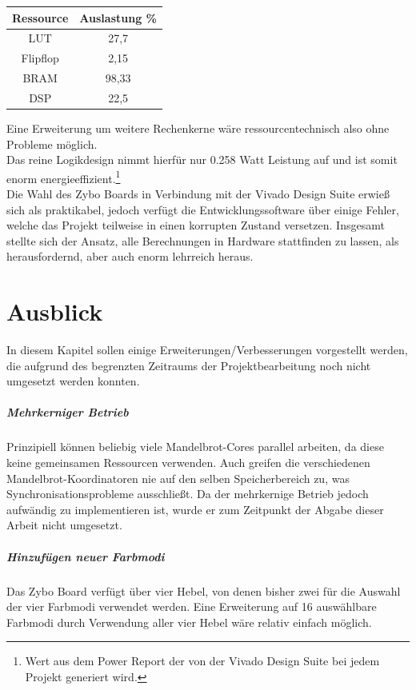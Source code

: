 \documentclass[a4paper,12pt,onesided]{report}
\begin{document}
\begin{table}[H]
	\centering
	\begin{tabular}{|c|c|}
		\hline
		Ressource & Auslastung \% \\ \hline
		LUT & 27,7 \\ \hline
		Flipflop & 2,15 \\ \hline
		BRAM & 98,33 \\ \hline
		DSP & 22,5 \\ \hline
	\end{tabular}
\end{table}

Eine Erweiterung um weitere Rechenkerne wäre ressourcentechnisch also ohne Probleme möglich.\\
Das reine Logikdesign nimmt hierfür nur 0.258 Watt Leistung auf und ist somit enorm energieeffizient.\footnote{Wert aus dem Power Report der von der Vivado Design Suite bei jedem Projekt generiert wird.}\\
Die Wahl des Zybo Boards in Verbindung mit der Vivado Design Suite erwieß sich als praktikabel, jedoch verfügt die Entwicklungssoftware über einige Fehler, welche das Projekt teilweise in einen korrupten Zustand versetzen.
Insgesamt stellte sich der Ansatz, alle Berechnungen in Hardware stattfinden zu lassen, als herausfordernd, aber auch enorm lehrreich heraus.


\chapter{Ausblick}
In diesem Kapitel sollen einige Erweiterungen/Verbesserungen vorgestellt werden, die aufgrund des begrenzten Zeitraums der Projektbearbeitung noch nicht umgesetzt werden konnten.

\paragraph{Mehrkerniger Betrieb}
Prinzipiell können beliebig viele Mandelbrot-Cores parallel arbeiten, da diese keine gemeinsamen Ressourcen verwenden. Auch greifen die verschiedenen Mandelbrot-Koordinatoren nie auf den selben Speicherbereich zu, was Synchronisationsprobleme ausschließt. Da der mehrkernige Betrieb jedoch aufwändig zu implementieren ist, wurde er zum Zeitpunkt der Abgabe dieser Arbeit nicht umgesetzt.

\paragraph{Hinzufügen neuer Farbmodi}
Das Zybo Board verfügt über vier Hebel, von denen bisher zwei für die Auswahl der vier Farbmodi verwendet werden. Eine Erweiterung auf 16 auswählbare Farbmodi durch Verwendung aller vier Hebel wäre relativ einfach möglich.
\end{document}
